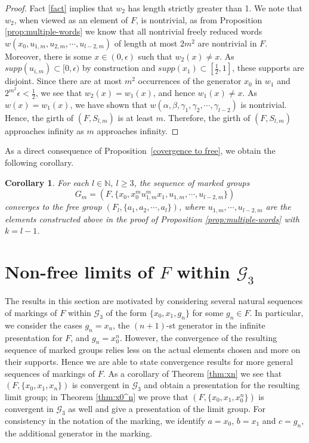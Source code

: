 \documentclass[11pt]{amsart}
\newtheorem{corollary}[theorem]{Corollary}
\begin{document}
\begin{proof}
Fact \ref{fact} implies that $w_2$ has length strictly greater than 1.  We note that $w_2$, when viewed as an element of $F$, is nontrivial, as from Proposition \ref{prop:multiple-words} we know that all nontrivial freely reduced words $w(x_0,u_{1,m},u_{2,m}, \cdots ,u_{l-2,m})$
of length at most $2m^2$ are nontrivial in $F$. Moreover, there is some $x \in (0,\epsilon)$ such that $w_2(x) \neq x$.
As
$supp(u_{i,m}) \subset [0,\epsilon)$ by construction and
$supp(x_1) \subset [\frac{1}{2},1]$, these supports are disjoint.
Since there are at most $m^2$ occurrences of the generator $x_0$ in
$w_1$ and $2^{m^2}\epsilon < \frac{1}{2}$,  we see that $w_2(x) = w_1(x)$, and hence $w_1(x) \neq x$. As $w(x) =
w_1(x)$, we have shown that $w(\alpha,\beta,\gamma_1,\gamma_2,
\cdots ,\gamma_{l-2})$ is nontrivial. Hence, the girth of
$(F,S_{l,m})$ is at least $m$.
Therefore, the girth of $(F,S_{l,m})$ approaches infinity as $m$
approaches infinity.

\end{proof}

As a direct consequence of Proposition~\ref{covergence to free},
we obtain the following corollary.

\begin{corollary}\label{cor:free-limit}
For each $l \in {\mathbb N}, \ l \geq 3$, the sequence of marked groups
$$G_m=(F,\{x_0,x_0^mu_{1,m}^mx_1,u_{1,m},
 \cdots ,u_{l-2,m}\})$$ converges to the free group $(F_l,\{a_1,a_2, \cdots ,a_l \})$, where $u_{1,m}, \cdots ,u_{l-2,m}$ are the
 elements constructed above in the proof of Proposition \ref{prop:multiple-words} with $k=l-1$.
\end{corollary}

\section{Non-free limits of $F$ within ${\mathcal G}_3$}
\label{sec:notfree}

The results in this section are motivated by considering several natural sequences of markings of $F$ within ${\mathcal G}_3$ of the form $\{x_0,x_1,g_n\}$ for some $g_n \in F$.  In particular, we consider the cases $g_n = x_n$, the $(n+1)$-st generator in the infinite presentation for $F$, and $g_n = x_0^n$.  However, the convergence of the resulting sequence of marked groups relies less on the actual elements chosen and more on their supports.  Hence we are able to state convergence results for more general sequences of markings of $F$.  As a corollary of Theorem \ref{thm:xn} we see that $(F,\{x_0,x_1,x_n\})$ is convergent in ${\mathcal G}_3$ and obtain a presentation for the resulting limit group; in Theorem \ref{thm:x0^n} we prove that $(F,\{x_0,x_1,x_0^n\})$ is convergent in ${\mathcal G}_3$ as well and give a presentation of the limit group.   For consistency in the notation of the marking, we identify $a=x_0$, $b=x_1$ and $c=g_n$, the additional generator in the marking.
\end{document}
